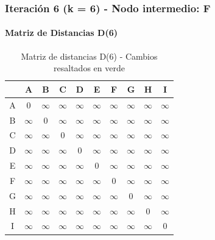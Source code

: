 \documentclass[12pt]{article}
\begin{document}
\subsubsection{Iteración 6 (k = 6) - Nodo intermedio: F}
\paragraph{Matriz de Distancias D(6)}
\begin{table}[h!]
\centering
\begin{tabular}{|c|c|c|c|c|c|c|c|c|c|}
\hline
 & A & B & C & D & E & F & G & H & I \\\hline
A & 0 & $\infty$ & $\infty$ & $\infty$ & $\infty$ & $\infty$ & $\infty$ & $\infty$ & $\infty$ \\\hline
B & $\infty$ & 0 & $\infty$ & $\infty$ & $\infty$ & $\infty$ & $\infty$ & $\infty$ & $\infty$ \\\hline
C & $\infty$ & $\infty$ & 0 & $\infty$ & $\infty$ & $\infty$ & $\infty$ & $\infty$ & $\infty$ \\\hline
D & $\infty$ & $\infty$ & $\infty$ & 0 & $\infty$ & $\infty$ & $\infty$ & $\infty$ & $\infty$ \\\hline
E & $\infty$ & $\infty$ & $\infty$ & $\infty$ & 0 & $\infty$ & $\infty$ & $\infty$ & $\infty$ \\\hline
F & $\infty$ & $\infty$ & $\infty$ & $\infty$ & $\infty$ & 0 & $\infty$ & $\infty$ & $\infty$ \\\hline
G & $\infty$ & $\infty$ & $\infty$ & $\infty$ & $\infty$ & $\infty$ & 0 & $\infty$ & $\infty$ \\\hline
H & $\infty$ & $\infty$ & $\infty$ & $\infty$ & $\infty$ & $\infty$ & $\infty$ & 0 & $\infty$ \\\hline
I & $\infty$ & $\infty$ & $\infty$ & $\infty$ & $\infty$ & $\infty$ & $\infty$ & $\infty$ & 0 \\\hline
\end{tabular}
\caption{Matriz de distancias D(6) - Cambios resaltados en verde}
\end{table}
\end{document}
